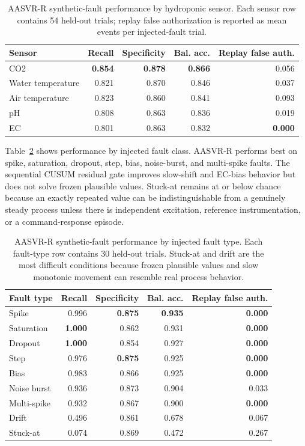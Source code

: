 \documentclass[preprint,12pt,doubleblind]{elsarticle}
\newcommand{\best}[1]{\textbf{#1}}
\begin{document}
\begin{table}[t]
\centering
\caption{AASVR-R synthetic-fault performance by hydroponic sensor. Each sensor row contains 54 held-out trials; replay false authorization is reported as mean events per injected-fault trial.}
\label{tab:sensorwise}
\begin{tabular}{lrrrr}
\toprule
Sensor & Recall & Specificity & Bal. acc. & Replay false auth. \\
\midrule
CO2 & \best{0.854} & \best{0.878} & \best{0.866} & 0.056 \\
Water temperature & 0.821 & 0.870 & 0.846 & 0.037 \\
Air temperature & 0.823 & 0.860 & 0.841 & 0.093 \\
pH & 0.808 & 0.863 & 0.836 & 0.019 \\
EC & 0.801 & 0.863 & 0.832 & \best{0.000} \\
\bottomrule
\end{tabular}
\end{table}

Table~\ref{tab:faulttype} shows performance by injected fault class. AASVR-R performs best on spike, saturation, dropout, step, bias, noise-burst, and multi-spike faults. The sequential CUSUM residual gate improves slow-shift and EC-bias behavior but does not solve frozen plausible values. Stuck-at remains at or below chance because an exactly repeated value can be indistinguishable from a genuinely steady process unless there is independent excitation, reference instrumentation, or a command-response episode.

\begin{table}[!htbp]
\centering
\caption{AASVR-R synthetic-fault performance by injected fault type. Each fault-type row contains 30 held-out trials. Stuck-at and drift are the most difficult conditions because frozen plausible values and slow monotonic movement can resemble real process behavior.}
\label{tab:faulttype}
\begin{tabular}{lrrrr}
\toprule
Fault type & Recall & Specificity & Bal. acc. & Replay false auth. \\
\midrule
Spike & 0.996 & \best{0.875} & \best{0.935} & \best{0.000} \\
Saturation & \best{1.000} & 0.862 & 0.931 & \best{0.000} \\
Dropout & \best{1.000} & 0.854 & 0.927 & \best{0.000} \\
Step & 0.976 & \best{0.875} & 0.925 & \best{0.000} \\
Bias & 0.983 & 0.866 & 0.925 & \best{0.000} \\
Noise burst & 0.936 & 0.873 & 0.904 & 0.033 \\
Multi-spike & 0.932 & 0.867 & 0.900 & \best{0.000} \\
Drift & 0.496 & 0.861 & 0.678 & 0.067 \\
Stuck-at & 0.074 & 0.869 & 0.472 & 0.267 \\
\bottomrule
\end{tabular}
\end{table}
\end{document}
